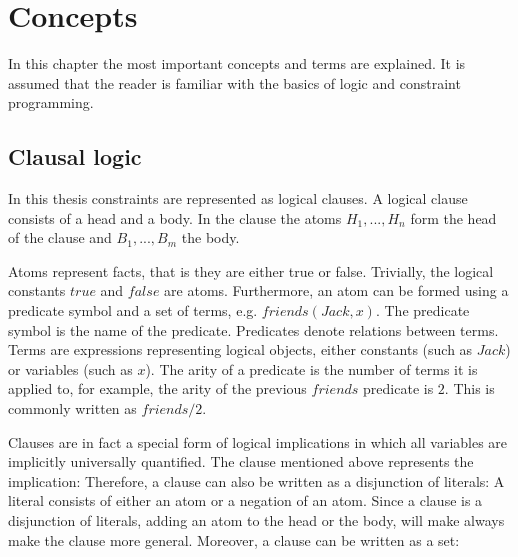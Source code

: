 \chapter{Concepts}
\label{cha:bg}

In this chapter the most important concepts and terms are explained. It is assumed that the reader is familiar with the basics of logic and constraint programming.

\section{Clausal logic}
\label{sec:clausal_logic}
In this thesis constraints are represented as logical clauses. A logical clause consists of a head and a body. In the clause the atoms $H_1, ..., H_n$ form the head of the clause and $B_1, ..., B_m$ the body. 

Atoms represent facts, that is they are either true or false. Trivially, the logical constants $true$ and $false$ are atoms. Furthermore, an atom can be formed using a predicate symbol and a set of terms, e.g. $friends(Jack, x)$. The predicate symbol is the name of the predicate. Predicates denote relations between terms. Terms are expressions representing logical objects, either constants (such as $Jack$) or variables (such as $x$). The arity of a predicate is the number of terms it is applied to, for example, the arity of the previous $friends$ predicate is $2$.
This is commonly written as $\mathit{friends}/2$.

Clauses are in fact a special form of logical implications in which all variables are implicitly universally quantified. The clause mentioned above represents the implication:  Therefore, a clause can also be written as a disjunction of literals:  A literal consists of either an atom or a negation of an atom. Since a clause is a disjunction of literals, adding an atom to the head or the body, will make always make the clause more general. Moreover, a clause can be written as a set: 

